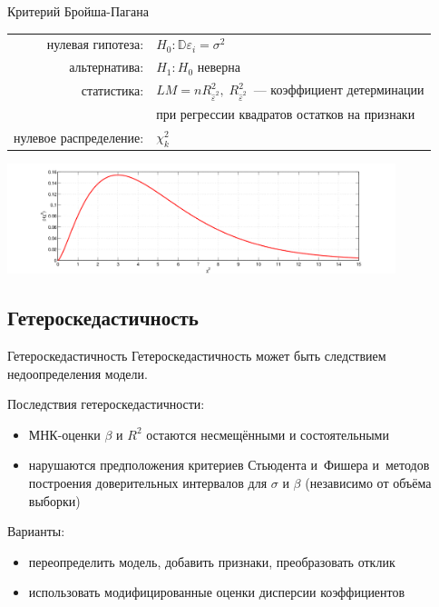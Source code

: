 \documentclass[9pt,pdf,utf8,hyperref={unicode},aspectratio=169]{beamer}
\begin{document}
\begin{frame}{Критерий Бройша-Пагана}
    \begin{center}
        \begin{tabular}{rl}
            нулевая гипотеза:               & $H_0\colon \mathbb{D}\varepsilon_i = \sigma^2$ \\
            альтернатива:                   & $H_1\colon H_0$ неверна\\
            статистика:                     & $LM = n R^2_{\hat{\varepsilon}^2}, \; R^2_{\hat{\varepsilon}^2}$~--- коэффициент детерминации \\
                                            & при регрессии квадратов остатков на признаки \\
            нулевое распределение:          & $\chi^2_{k}$\\
        \end{tabular}
        \includegraphics[width=0.85\textwidth]{chi2.png}
    \end{center}
\end{frame}

\subsection{Гетероскедастичность}
\begin{frame}{Гетероскедастичность}
    Гетероскедастичность может быть следствием недоопределения модели.

    \bigskip

    Последствия гетероскедастичности:
    \begin{itemize}
    \item МНК-оценки $\beta$ и $R^2$ остаются несмещёнными и состоятельными
    \item нарушаются предположения критериев Стьюдента и~Фишера и~методов построения доверительных интервалов для $\sigma$ и $\beta$ (независимо от объёма выборки) %
    \end{itemize}

    \bigskip

    Варианты:
    \begin{itemize}
    \item переопределить модель, добавить признаки, преобразовать отклик
    \item использовать модифицированные оценки дисперсии коэффициентов
    \end{itemize}
\end{frame}
\end{document}
